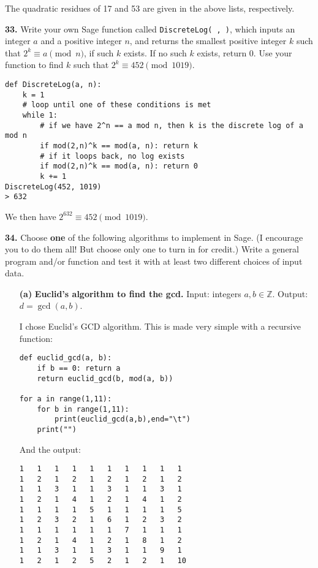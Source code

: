 \documentclass[12pt]{amsart}
\def\ZZ{{\mathbb Z}}
\begin{document}
\smallskip

The quadratic residues of 17 and 53 are given in the above lists, respectively.

\medskip

{\bf 33.}   Write your own Sage function called {\tt DiscreteLog( , )}, which inputs an integer $a$ and a positive integer $n$, and returns the smallest positive integer $k$ such that $2^k\equiv a \pmod{n}$, if such $k$ exists.  If no such $k$ exists, return $0$.  Use your function to find $k$ such that $2^k\equiv 452 \pmod{1019}$.

\medskip


\begin{verbatim}
def DiscreteLog(a, n):
    k = 1
    # loop until one of these conditions is met
    while 1:
        # if we have 2^n == a mod n, then k is the discrete log of a mod n
        if mod(2,n)^k == mod(a, n): return k
        # if it loops back, no log exists
        if mod(2,n)^k == mod(a, n): return 0
        k += 1
DiscreteLog(452, 1019)
> 632
\end{verbatim}

\smallskip

We then have $2^{632}\equiv 452\pmod{1019}$.

\medskip

{\bf 34.}  Choose {\bf one} of the following algorithms to implement in Sage.  (I encourage you to do them all! But choose only one to turn in for credit.)  Write a general program and/or function and test it with at least two different choices of input data.

\begin{itemize}
\item[{\bf (a)}] {\bf Euclid's algorithm to find the gcd.}  Input: integers $a,b\in\ZZ$.  Output: $d=\gcd(a,b)$.

\medskip

I chose Euclid's GCD algorithm. This is made very simple with a recursive function:

\begin{verbatim}
def euclid_gcd(a, b):
    if b == 0: return a
    return euclid_gcd(b, mod(a, b))

for a in range(1,11):
    for b in range(1,11):
        print(euclid_gcd(a,b),end="\t")
    print("")

\end{verbatim}

And the output:

\begin{verbatim}
1	1	1	1	1	1	1	1	1	1	
1	2	1	2	1	2	1	2	1	2	
1	1	3	1	1	3	1	1	3	1	
1	2	1	4	1	2	1	4	1	2	
1	1	1	1	5	1	1	1	1	5	
1	2	3	2	1	6	1	2	3	2	
1	1	1	1	1	1	7	1	1	1	
1	2	1	4	1	2	1	8	1	2	
1	1	3	1	1	3	1	1	9	1	
1	2	1	2	5	2	1	2	1	10	
\end{verbatim}

\end{itemize}
\end{document}
